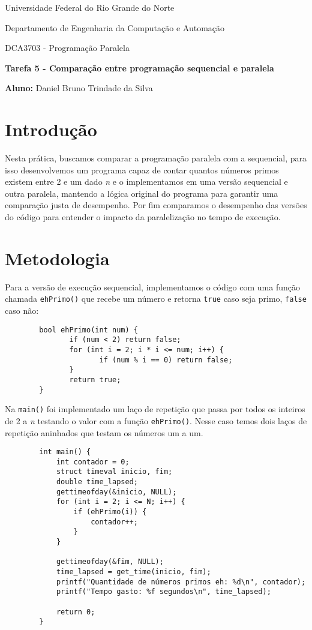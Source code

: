 \documentclass[a4paper, 12pt]{article}
\begin{document}
	\begin{center}
		Universidade Federal do Rio Grande do Norte
		
		Departamento de Engenharia da Computação e Automação
		
		DCA3703 - Programação Paralela
		
		\textbf{Tarefa 5 - Comparação entre programação sequencial e paralela}
		
		\textbf{Aluno:} Daniel Bruno Trindade da Silva
	\end{center}
	
	\section{Introdução}
	\hspace{.7cm}Nesta prática, buscamos comparar a programação paralela com a sequencial, para isso desenvolvemos um programa capaz de contar quantos números primos existem entre 2 e um dado \textit{n} e o implementamos em uma versão sequencial e outra paralela, mantendo a lógica original do programa para garantir uma comparação justa de desempenho. Por fim comparamos o desempenho das versões do código para entender o impacto da paralelização no tempo de execução.
	
	\section{Metodologia}
	\hspace{.7cm}Para a versão de execução sequencial, implementamos o código com uma  função chamada \texttt{ehPrimo()} que recebe um número e retorna \texttt{true} caso seja primo, \texttt{false} caso não:
	
	\begin{verbatim}
		bool ehPrimo(int num) {
			   if (num < 2) return false;
			   for (int i = 2; i * i <= num; i++) {
				      if (num % i == 0) return false;
			   }
			   return true;
		}
	\end{verbatim}
	
	Na \texttt{main()} foi implementado um laço de repetição que passa por todos os inteiros de 2 a \textit{n} testando o valor com a função \texttt{ehPrimo()}. Nesse caso temos dois laços de repetição aninhados que testam os números um a um.
	
	\begin{verbatim}
		int main() {
		    int contador = 0;
		    struct timeval inicio, fim;
		    double time_lapsed;
		    gettimeofday(&inicio, NULL);
		    for (int i = 2; i <= N; i++) {
		        if (ehPrimo(i)) {
		            contador++;
		        }
		    }
		    
		    gettimeofday(&fim, NULL); 
		    time_lapsed = get_time(inicio, fim);
		    printf("Quantidade de números primos eh: %d\n", contador);
		    printf("Tempo gasto: %f segundos\n", time_lapsed);
		    
		    return 0;
		}
	\end{verbatim}
	
\end{document}
